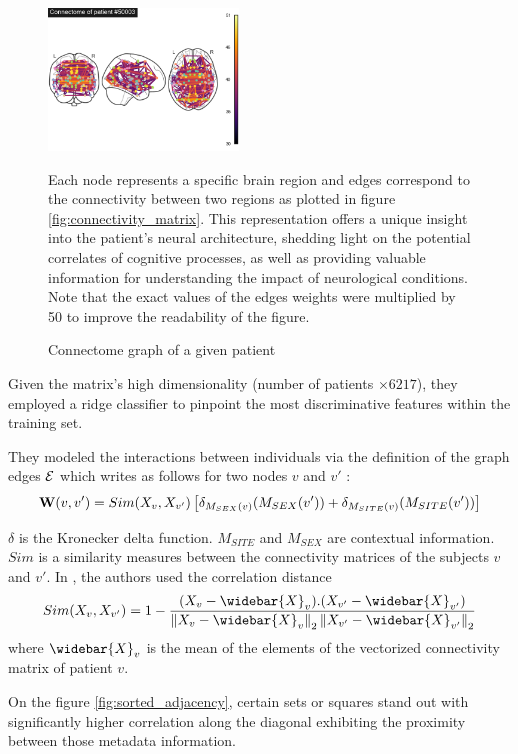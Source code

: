 \begin{figure}[h!]
    \centering
    \includegraphics[width=0.45\textwidth]{figures/ex_connectivity_pitt_ASD.png}
    \caption{Connectome graph of a given patient}  Each node represents a specific brain region and edges correspond to the connectivity between two regions as plotted in figure \ref{fig:connectivity_matrix}. This representation offers a unique insight into the patient's neural architecture, shedding light on the potential correlates of cognitive processes, as well as providing valuable information for understanding the impact of neurological conditions. Note that the exact values of the edges weights were multiplied by 50 to improve the readability of the figure.
    \Description{}
    \label{fig:connectome}
\end{figure}

Given the matrix's high dimensionality (number of patients $\times 6217$), they employed a ridge classifier to pinpoint the most discriminative features within the training set.

They modeled the interactions between individuals via the definition of the graph edges $\mathcal{E}$ which writes as follows for two nodes $v$ and $v'$ :
$$ 
    \mathbf{W}(v, v') = Sim(X_v, X_{v'}) \left[\delta_{M_{SEX}(v)}(M_{SEX}(v')) + \delta_{M_{SITE}(v)}(M_{SITE}(v')) \right]
$$

$\delta$ is the Kronecker delta function.  $M_{SITE}$ and $M_{SEX}$ are contextual information. $Sim$ is a similarity measures between the connectivity matrices of the subjects $v$ and $v'$. In \cite{Parisot17}, the authors used the correlation distance 
$$
Sim(X_v, X_{v'}) =  1 - \frac{(X_v - \widebar{X}_v).(X_{v'} - \widebar{X}_{v'})}{\norm{X_v -\widebar{X}_{v}}_2\norm{X_{v'} - \widebar{X}_{v'}}_2}
$$
where $\widebar{X}_v$ is the mean of the elements of the vectorized connectivity matrix of patient $v$. 

On the figure \ref{fig:sorted_adjacency}, certain sets or squares stand out with significantly higher correlation along the diagonal exhibiting the proximity between those metadata information. 

